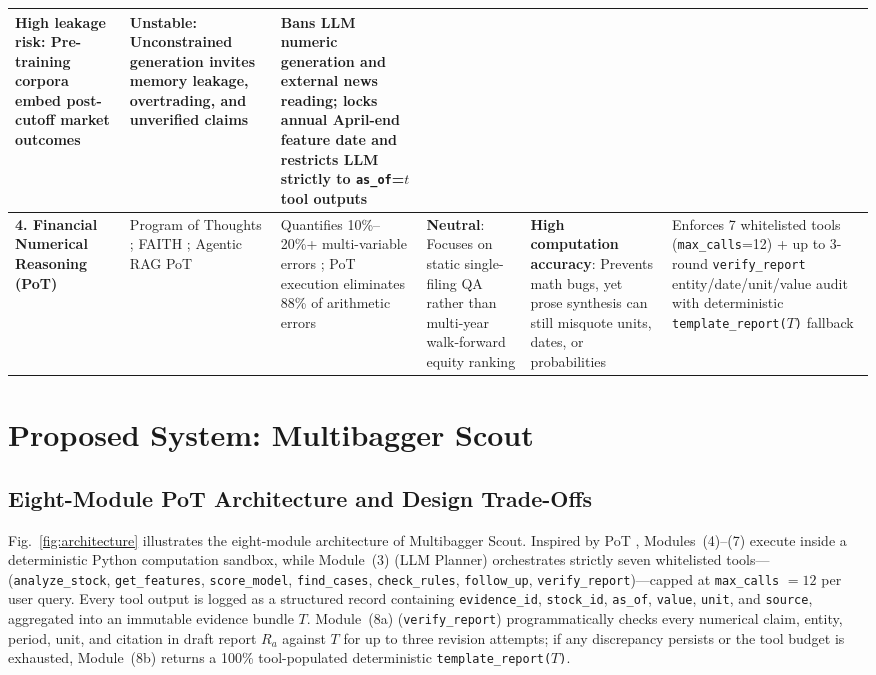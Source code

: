 \documentclass[conference]{IEEEtran}
\begin{document}
\begin{table}[t]
\begin{tabularx}{\textwidth}{L{2.35cm} L{2.45cm} L{3.0cm} L{2.85cm} L{2.75cm} Y}
\textbf{High leakage risk}: Pre-training corpora embed post-cutoff market outcomes \cite{he2025chrono, didisheim2025, gao2026} &
\textbf{Unstable}: Unconstrained generation invites memory leakage, overtrading, and unverified claims &
Bans LLM numeric generation and external news reading; locks annual April-end feature date and restricts LLM strictly to \texttt{as\_of}=$t$ tool outputs \\
\midrule
\textbf{4. Financial Numerical Reasoning (PoT)} &
Program of Thoughts \cite{chen2023pot}; FAITH \cite{faith2025}; Agentic RAG PoT \cite{agenticrag2026} &
Quantifies 10\%--20\%+ multi-variable errors \cite{faith2025}; PoT execution eliminates 88\% of arithmetic errors \cite{agenticrag2026} &
\textbf{Neutral}: Focuses on static single-filing QA rather than multi-year walk-forward equity ranking &
\textbf{High computation accuracy}: Prevents math bugs, yet prose synthesis can still misquote units, dates, or probabilities &
Enforces 7 whitelisted tools (\texttt{max\_calls}=12) + up to 3-round \texttt{verify\_report} entity/date/unit/value audit with deterministic \texttt{template\_report($T$)} fallback \\
\bottomrule
\end{tabularx}
\end{table}

\section{Proposed System: Multibagger Scout}

\subsection{Eight-Module PoT Architecture and Design Trade-Offs}
Fig.~\ref{fig:architecture} illustrates the eight-module architecture of Multibagger Scout. Inspired by PoT \cite{chen2023pot}, Modules~(4)--(7) execute inside a deterministic Python computation sandbox, while Module~(3) (LLM Planner) orchestrates strictly seven whitelisted tools---(\texttt{analyze\_stock}, \texttt{get\_features}, \texttt{score\_model}, \texttt{find\_cases}, \texttt{check\_rules}, \texttt{follow\_up}, \texttt{verify\_report})---capped at \texttt{max\_calls} $= 12$ per user query. Every tool output is logged as a structured record containing \texttt{evidence\_id}, \texttt{stock\_id}, \texttt{as\_of}, \texttt{value}, \texttt{unit}, and \texttt{source}, aggregated into an immutable evidence bundle $T$. Module~(8a) (\texttt{verify\_report}) programmatically checks every numerical claim, entity, period, unit, and citation in draft report $R_a$ against $T$ for up to three revision attempts; if any discrepancy persists or the tool budget is exhausted, Module~(8b) returns a 100\% tool-populated deterministic \texttt{template\_report($T$)}.
\end{document}
